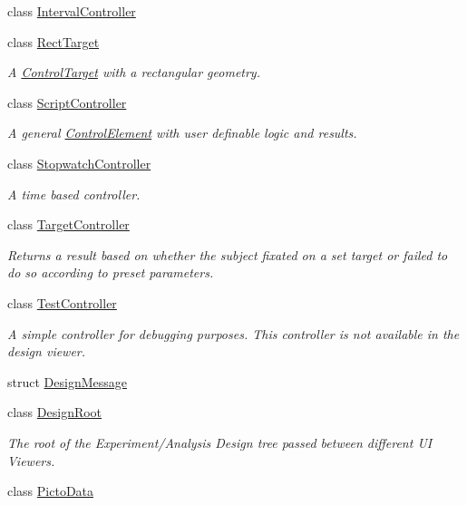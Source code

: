 \begin{DoxyCompactItemize}
\item 
class \hyperlink{class_picto_1_1_interval_controller}{Interval\-Controller}
\item 
class \hyperlink{class_picto_1_1_rect_target}{Rect\-Target}
\begin{DoxyCompactList}\small\item\em A \hyperlink{class_picto_1_1_control_target}{Control\-Target} with a rectangular geometry. \end{DoxyCompactList}\item 
class \hyperlink{class_picto_1_1_script_controller}{Script\-Controller}
\begin{DoxyCompactList}\small\item\em A general \hyperlink{class_picto_1_1_control_element}{Control\-Element} with user definable logic and results. \end{DoxyCompactList}\item 
class \hyperlink{class_picto_1_1_stopwatch_controller}{Stopwatch\-Controller}
\begin{DoxyCompactList}\small\item\em A time based controller. \end{DoxyCompactList}\item 
class \hyperlink{class_picto_1_1_target_controller}{Target\-Controller}
\begin{DoxyCompactList}\small\item\em Returns a result based on whether the subject fixated on a set target or failed to do so according to preset parameters. \end{DoxyCompactList}\item 
class \hyperlink{class_picto_1_1_test_controller}{Test\-Controller}
\begin{DoxyCompactList}\small\item\em A simple controller for debugging purposes. This controller is not available in the design viewer. \end{DoxyCompactList}\item 
struct \hyperlink{struct_picto_1_1_design_message}{Design\-Message}
\item 
class \hyperlink{class_picto_1_1_design_root}{Design\-Root}
\begin{DoxyCompactList}\small\item\em The root of the Experiment/\-Analysis Design tree passed between different U\-I Viewers. \end{DoxyCompactList}\item 
class \hyperlink{class_picto_1_1_picto_data}{Picto\-Data}

\end{DoxyCompactItemize}
